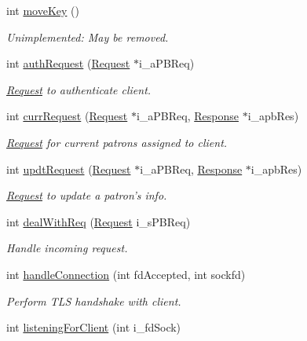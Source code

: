 \begin{DoxyCompactItemize}
int \hyperlink{classGTBCommunication_a42a7648197f7ae8f3817aa8ff9ebca73}{move\-Key} ()
\begin{DoxyCompactList}\small\item\em Unimplemented\-: May be removed. \end{DoxyCompactList}\item 
int \hyperlink{classGTBCommunication_aed33aec9911e0d570d4653cabd776d6b}{auth\-Request} (\hyperlink{classRequest}{Request} $\ast$i\-\_\-a\-P\-B\-Req)
\begin{DoxyCompactList}\small\item\em \hyperlink{classRequest}{Request} to authenticate client. \end{DoxyCompactList}\item 
int \hyperlink{classGTBCommunication_ae20ca3b3751720d3ef10bbdfbd4cd25a}{curr\-Request} (\hyperlink{classRequest}{Request} $\ast$i\-\_\-a\-P\-B\-Req, \hyperlink{classResponse}{Response} $\ast$i\-\_\-apb\-Res)
\begin{DoxyCompactList}\small\item\em \hyperlink{classRequest}{Request} for current patrons assigned to client. \end{DoxyCompactList}\item 
int \hyperlink{classGTBCommunication_afd6c49f0bd73a7c2014673b58c87c68b}{updt\-Request} (\hyperlink{classRequest}{Request} $\ast$i\-\_\-a\-P\-B\-Req, \hyperlink{classResponse}{Response} $\ast$i\-\_\-apb\-Res)
\begin{DoxyCompactList}\small\item\em \hyperlink{classRequest}{Request} to update a patron's info. \end{DoxyCompactList}\item 
int \hyperlink{classGTBCommunication_ac0d209ae00b1820f5f29ec7d15f418d6}{deal\-With\-Req} (\hyperlink{classRequest}{Request} i\-\_\-s\-P\-B\-Req)
\begin{DoxyCompactList}\small\item\em Handle incoming request. \end{DoxyCompactList}\item 
int \hyperlink{classGTBCommunication_a6353b9cc417d4f7a3fd309fc911cf8f1}{handle\-Connection} (int fd\-Accepted, int sockfd)
\begin{DoxyCompactList}\small\item\em Perform T\-L\-S handshake with client. \end{DoxyCompactList}\item 
int \hyperlink{classGTBCommunication_a2f5260afdc69079471e21fd855e7dcc3}{listening\-For\-Client} (int i\-\_\-fd\-Sock)

\end{DoxyCompactItemize}
